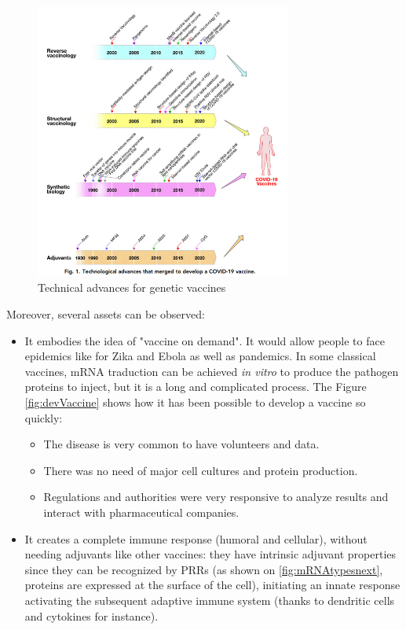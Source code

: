 \documentclass{article}
\begin{document}
            \begin{figure}
                \centering
                \includegraphics[width=0.75\textwidth]{imgs/Revolution.PNG}
                \caption{Technical advances for genetic vaccines \autocite{rappuoliVaccinologyPostCOVID192021}}
                \label{fig:revolution}
            \end{figure}

            Moreover, several assets can be observed:
            \begin{itemize}
                \item It embodies the idea of "vaccine on demand". It would allow people to face epidemics like for Zika and Ebola as well as pandemics.
                    In some classical vaccines, mRNA traduction can be achieved \emph{in vitro} to produce the pathogen proteins to inject, but it is a long and complicated process.
                    The Figure \ref{fig:devVaccine} shows how it has been possible to develop a vaccine so quickly:
                        \begin{itemize}
                            \item The disease is very common to have volunteers and data.
                            \item There was no need of major cell cultures and protein production.
                            \item Regulations and authorities were very responsive to analyze results and interact with pharmaceutical companies.
                        \end{itemize}
                \item It creates a complete immune response (humoral and cellular), without needing adjuvants like other vaccines:
                    they have intrinsic adjuvant properties since they can be recognized by PRRs
                    (as shown on \ref{fig:mRNAtypesnext}, proteins are expressed at the surface of the cell), initiating an innate response activating
                    the subsequent adaptive immune system (thanks to dendritic cells and cytokines for instance).
            \end{itemize}
\end{document}
